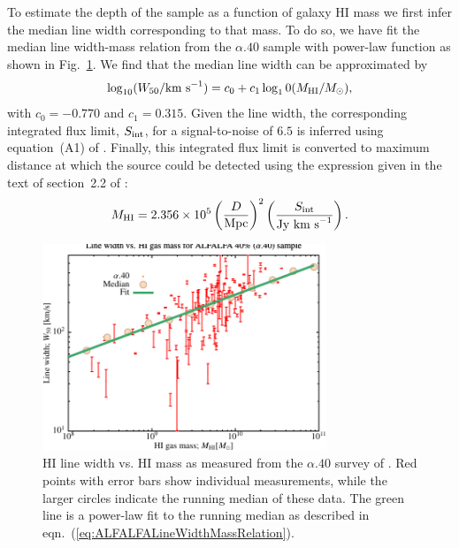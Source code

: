 To estimate the depth of the \cite{martin_arecibo_2010} sample as a function of galaxy HI mass we first infer the median line width corresponding to that mass. To do so, we have fit the median line width-mass relation from the $\alpha.40$ sample with power-law function as shown in Fig.~\ref{fig:ALFALFALineWidthMassRelation}. We find that the median line width can be approximated by
\begin{equation}
 \log_{10} (W_{\rm 50}/\hbox{km s}^{-1}) = c_0 + c_1 \log_10(M_{\rm HI}/M_\odot),
 \label{eq:ALFALFALineWidthMassRelation}
\end{equation}
with $c_0=-0.770$ and $c_1=0.315$. Given the line width, the corresponding integrated flux limit, $S_{\rm int}$, for a signal-to-noise of $6.5$ is inferred using equation~(A1) of \cite{haynes_arecibo_2011}. Finally, this integrated flux limit is converted to maximum distance at which the source could be detected using the expression given in the text of section~2.2 of \cite{martin_arecibo_2010}:
\begin{equation}
 M_{\rm HI} = 2.356\times10^5 \left({D\over \hbox{Mpc}}\right)^2 \left({S_{\rm int}\over\hbox{Jy km s}^{-1}}\right).
\end{equation}

\begin{figure}
 \begin{center}
  \includegraphics[width=85mm,trim=0mm 0mm 0mm 4mm,clip]{Plots/DataAnalysis/alfalfaHILineWidthMassRelation.pdf}
 \end{center}
 \caption{HI line width vs. HI mass as measured from the $\alpha.40$ survey of \protect\cite{martin_arecibo_2010}. Red points with error bars show individual measurements, while the larger circles indicate the running median of these data. The green line is a power-law fit to the running median as described in eqn.~(\protect\ref{eq:ALFALFALineWidthMassRelation}).}
 \label{fig:ALFALFALineWidthMassRelation}
\end{figure}

